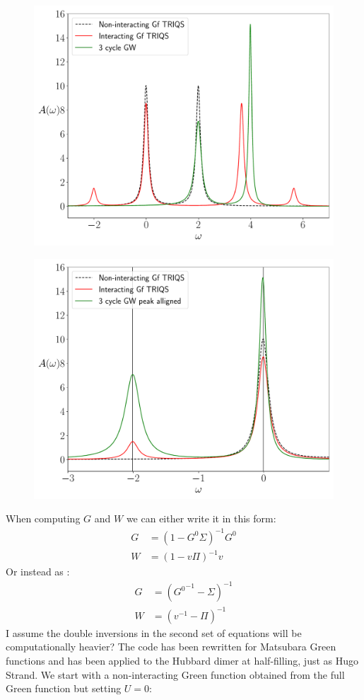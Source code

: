 \documentclass[12pt]{article}
\begin{document}
\begin{figure}[h!]
\center
\includegraphics[scale=0.6]{qf.pdf}
\end{figure}
\begin{figure}[h!]
\center
\includegraphics[scale=0.6]{aligned.pdf}
\end{figure}
\newpage
\noindent
When computing $G$ and $W$ we can either write it in this form:
\begin{align*}
G&=(1-G^0\Sigma)^{-1}G^0\\
W&=(1-v\Pi)^{-1}v
\end{align*}
Or instead as :
\begin{align*}
G&=({G^0}^{-1}-\Sigma)^{-1}\\
W&=(v^{-1}-\Pi)^{-1}
\end{align*}
I assume the double inversions in the second set of equations will be computationally heavier?
\newpage
\noindent
The code has been rewritten for Matsubara Green functions and has been applied to the Hubbard dimer at half-filling, just as Hugo Strand. We start with a non-interacting Green function obtained from the full Green function but setting $U=0$:
\end{document}
